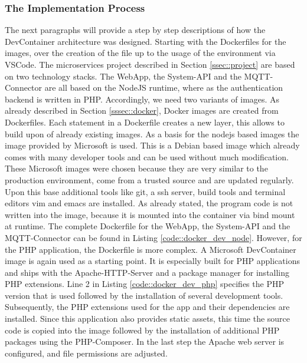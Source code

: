         \subsubsection{The Implementation Process}\label{ssec::imp_process}
        The next paragraphs will provide a step by step descriptions of how the DevContainer architecture was designed. Starting with the Dockerfiles for the images, over the creation of the  file up to the usage of the environment via \ac{VSCode}.
        The microservices project described in Section \ref{ssec::project} are based on two technology stacks. The WebApp, the System-API and the MQTT-Connector are all based on the NodeJS runtime, where as the authentication backend is written in PHP. Accordingly, we need two variants of images. As already described in Section \ref{sssec::docker}, Docker images are created from Dockerfiles. Each statement in a Dockerfile creates a new layer, this allows to build upon of already existing images.\newline
        As a basis for the nodejs based images the  image provided by Microsoft is used. This is a Debian based image which already comes with many developer tools and can be used without much modification. These Microsoft images were chosen because they are very similar to the production environment, come from a trusted source and are updated regularly. Upon this base additional tools like git, a ssh server, build tools and terminal editors vim and emacs are installed. As already stated, the program code is not written into the image, because it is mounted into the container via bind mount at runtime. The complete Dockerfile for the WebApp, the System-\ac{API} and the MQTT-Connector can be found in Listing \ref{code::docker_dev_node}.\newline
        However, for the PHP application, the Dockerfile is more complex. A Microsoft DevContainer image is again used as a starting point. It is especially built for PHP applications and ships with the Apache-\acs{HTTP}-Server and a package manager for installing PHP extensions. Line 2 in Listing \ref{code::docker_dev_php} specifies the PHP version that is used followed by the installation of several development tools. Subsequently, the PHP extensions used for the app and their dependencies are installed. Since this application also provides static assets, this time the source code is copied into the image followed by the installation of additional PHP packages using the PHP-Composer. In the last step the Apache web server is configured, and file permissions are adjusted. \newline
